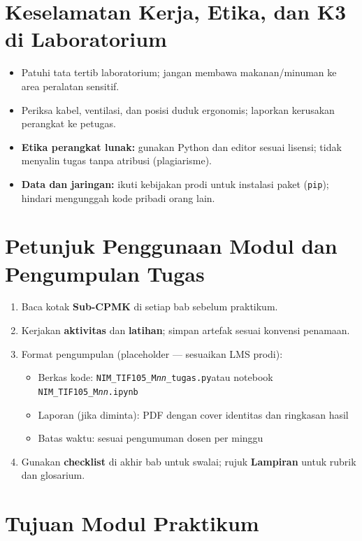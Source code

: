 \documentclass[../main.tex]{subfiles}
\begin{document}
\section{Keselamatan Kerja, Etika, dan K3 di Laboratorium}

\begin{itemize}[leftmargin=*]
  \item Patuhi tata tertib laboratorium; jangan membawa makanan/minuman ke area peralatan sensitif.
  \item Periksa kabel, ventilasi, dan posisi duduk ergonomis; laporkan kerusakan perangkat ke petugas.
  \item \textbf{Etika perangkat lunak:} gunakan Python dan editor sesuai lisensi; tidak menyalin tugas tanpa atribusi (plagiarisme).
  \item \textbf{Data dan jaringan:} ikuti kebijakan prodi untuk instalasi paket (\texttt{pip}); hindari mengunggah kode pribadi orang lain.
\end{itemize}

\section{Petunjuk Penggunaan Modul dan Pengumpulan Tugas}

\begin{enumerate}[leftmargin=*]
  \item Baca kotak \textbf{Sub-CPMK} di setiap bab sebelum praktikum.
  \item Kerjakan \textbf{aktivitas} dan \textbf{latihan}; simpan artefak sesuai konvensi penamaan.
  \item Format pengumpulan (placeholder --- sesuaikan LMS prodi):
  \begin{itemize}
    \item Berkas kode: \texttt{NIM\_TIF105\_M\textit{nn}\_tugas.py}\newline atau notebook \texttt{NIM\_TIF105\_M\textit{nn}.ipynb}
    \item Laporan (jika diminta): PDF dengan cover identitas dan ringkasan hasil
    \item Batas waktu: sesuai pengumuman dosen per minggu
  \end{itemize}
  \item Gunakan \textbf{checklist} di akhir bab untuk swalai; rujuk \textbf{Lampiran} untuk rubrik dan glosarium.
\end{enumerate}

\section{Tujuan Modul Praktikum}
\end{document}
